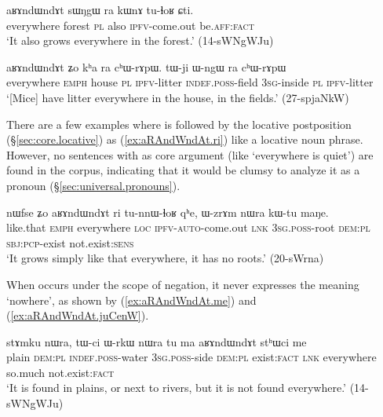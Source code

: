  \begin{exe}
\ex \label{ex:aRAndWndAt.Zo.loc}
\gll  aʁɤndɯndɤt sɯŋgɯ ra kɯnɤ tu-ɬoʁ ɕti. \\
everywhere forest \textsc{pl} also \textsc{ipfv}-come.out be.\textsc{aff}:\textsc{fact} \\
\glt `It also grows everywhere in the forest.' (14-sWNgWJu)
\end{exe} 

 \begin{exe}
\ex \label{ex:aRAndWndAt.Zo.loc2}
\gll  aʁɤndɯndɤt ʑo kʰa ra cʰɯ-rɤpɯ. tɯ-ji ɯ-ngɯ ra cʰɯ-rɤpɯ \\
everywhere \textsc{emph} house \textsc{pl} \textsc{ipfv}-litter \textsc{indef}.\textsc{poss}-field \textsc{3sg}-inside \textsc{pl} \textsc{ipfv}-litter \\
\glt `[Mice] have litter everywhere in the house, in the fields.' (27-spjaNkW)
\end{exe} 

There are a few examples where  is followed  by the locative postposition  (§\ref{sec:core.locative}) as (\ref{ex:aRAndWndAt.ri}) like a locative noun phrase. However, no sentences with  as core argument (like `everywhere is quiet') are found in the corpus, indicating that it would be clumsy to analyze it as a pronoun (§\ref{sec:universal.pronouns}).

 \begin{exe}
\ex \label{ex:aRAndWndAt.ri}
\gll nɯfse ʑo aʁɤndɯndɤt ri tu-nnɯ-ɬoʁ qʰe, ɯ-zrɤm nɯra kɯ-tu maŋe. \\
like.that \textsc{emph} everywhere \textsc{loc} \textsc{ipfv}-\textsc{auto}-come.out \textsc{lnk} \textsc{3sg}.\textsc{poss}-root \textsc{dem}:\textsc{pl} \textsc{sbj}:\textsc{pcp}-exist not.exist:\textsc{sens} \\
\glt `It grows simply like that everywhere, it has no roots.' (20-sWrna)
\end{exe} 

When  occurs under the scope of negation, it never expresses the meaning `nowhere', as shown by (\ref{ex:aRAndWndAt.me}) and (\ref{ex:aRAndWndAt.juCenW}).

\begin{exe}
\ex \label{ex:aRAndWndAt.me}
\gll stɤmku nɯra, tɯ-ci ɯ-rkɯ nɯra tu ma aʁɤndɯndɤt stʰɯci me \\
plain \textsc{dem}:\textsc{pl} \textsc{indef}.\textsc{poss}-water \textsc{3sg}.\textsc{poss}-side  \textsc{dem}:\textsc{pl} exist:\textsc{fact} \textsc{lnk} everywhere so.much not.exist:\textsc{fact} \\
\glt `It is found in plains, or next to rivers, but it is not found everywhere.' (14-sWNgWJu)
\end{exe} 

